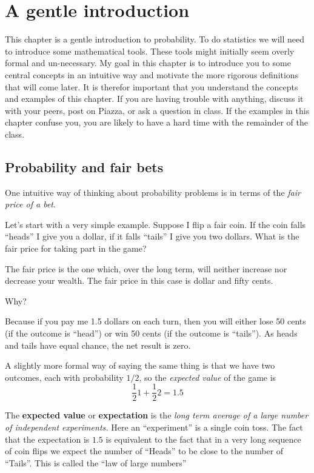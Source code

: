 \chapter{A gentle introduction}

This chapter is a gentle introduction to probability. To do statistics
we will need to introduce some mathematical tools. These tools might
initially seem overly formal and un-necessary. My goal in this chapter
is to introduce you to some central concepts in an intuitive way and
motivate the more rigorous definitions that will come later. It is
therefor important that you understand the concepts and examples of
this chapter. If you are having trouble with anything, discuss it with
your peers, post on Piazza, or ask a question in class. If the examples
in this chapter confuse you, you are likely to have a hard time with
the remainder of the class.

\section{Probability and fair bets}

One intuitive way of thinking about probability problems is in terms
of the {\em fair price of a bet}.

Let's start with a very simple example. Suppose I flip a fair coin.
If the coin falls ``heads'' I give you a dollar, if it falls ``tails''
I give you two dollars. What is the fair price for taking part in the
game?

The fair price is the one which, over the long term, will neither
increase nor decrease your wealth. The fair price in this case is
dollar and fifty cents.

Why?

Because if you pay me 1.5 dollars on each turn, then you will either
lose 50 cents (if the outcome is ``head'') or win 50 cents (if the
outcome is ``tails''). As heads and tails have equal chance, the net
result is zero.

A slightly more formal way of saying the same thing is that we have
two outcomes, each with probability $1/2$, so the {\em expected value}
of the game is 
\[
\frac{1}{2} 1 + \frac{1}{2} 2 = 1.5
\]

The {\bf expected value} or {\bf expectation} is the {\em long term
  average of a large number of independent experiments.} Here an
``experiment'' is a single coin toss. The fact that the expectation is
$1.5$ is equivalent to the fact that in a very long sequence of coin
flips we expect the number of ``Heads'' to be close to the number of
``Tails''. This is called the ``law of large numbers''

